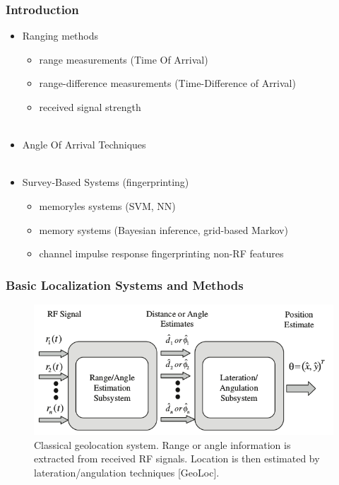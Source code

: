 \documentclass [t] {beamer} %
\begin{document}
\begin{frame} %
\frametitle{Introduction}
\phantom{m}
\begin{itemize}
\item
Ranging methods
\begin{itemize}
\item
range measurements (Time Of Arrival)
\item
range-difference measurements (Time-Difference of Arrival)
\item
received signal strength
\\~\\
\end{itemize}

\item
Angle Of Arrival Techniques
\\~\\
\item
Survey-Based Systems (fingerprinting)
\begin{itemize}
\item
memoryles systems (SVM, NN)
\item
memory systems (Bayesian inference, grid-based Markov)
\item
channel impulse response fingerprinting
non-RF features
\end{itemize}
\end{itemize}
\end{frame}

\begin{frame} %
\frametitle{Basic Localization Systems and Methods}
\begin{figure}[h]
\includegraphics[width=1.0\textwidth]{../figures/localization_example.png}
\caption{Classical geolocation system. Range or angle information is extracted from received RF signals. Location is then estimated by lateration/angulation techniques [GeoLoc].}
\label{fig:2step}
\end{figure}
\end{frame}
\end{document}

